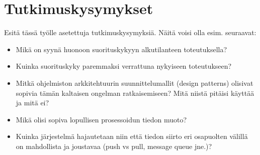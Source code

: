\section{Tutkimuskysymykset}
\begin{it}
Esitä tässä työlle asetettuja tutkimuskysymyksiä. Näitä voisi olla esim. seuraavat:
	\begin{itemize}
		\item Mikä on syynä huonoon suorituskykyyn alkutilanteen toteutuksella?
		\item Kuinka suorituskyky paremmaksi verrattuna nykyiseen toteutukseen?
		\item Mitkä ohjelmiston arkkitehtuurin suunnittelumallit (design patterns) olisivat sopivia tämän kaltaisen ongelman ratkaisemiseen? Mitä niistä pitäisi käyttää ja mitä ei?
		\item Mikä olisi sopiva lopullisen prosessoidun tiedon muoto?
		\item Kuinka järjestelmä hajautetaan niin että tiedon siirto eri osapuolten välillä on mahdollista ja joustavaa (push vs pull, message queue jne.)?
	\end{itemize}
\end{it}